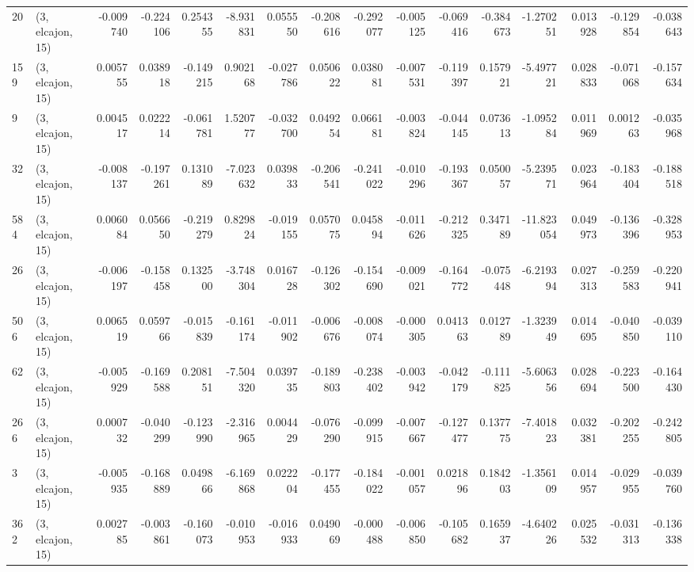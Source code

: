 \begin{tabular}{llrrrrrrrrrrrrrr}
20  &  (3, elcajon, 15) &  -0.009740 & -0.224106 &  0.254355 &   -8.931831 &  0.055550 &  -0.208616 & -0.292077 & -0.005125 & -0.069416 & -0.384673 &   -1.270251 &  0.013928 & -0.129854 & -0.038643 \\
159 &  (3, elcajon, 15) &   0.005755 &  0.038918 & -0.149215 &    0.902168 & -0.027786 &   0.050622 &  0.038081 & -0.007531 & -0.119397 &  0.157921 &   -5.497721 &  0.028833 & -0.071068 & -0.157634 \\
9   &  (3, elcajon, 15) &   0.004517 &  0.022214 & -0.061781 &    1.520777 & -0.032700 &   0.049254 &  0.066181 & -0.003824 & -0.044145 &  0.073613 &   -1.095284 &  0.011969 &  0.001263 & -0.035968 \\
32  &  (3, elcajon, 15) &  -0.008137 & -0.197261 &  0.131089 &   -7.023632 &  0.039833 &  -0.206541 & -0.241022 & -0.010296 & -0.193367 &  0.050057 &   -5.239571 &  0.023964 & -0.183404 & -0.188518 \\
584 &  (3, elcajon, 15) &   0.006084 &  0.056650 & -0.219279 &    0.829824 & -0.019155 &   0.057075 &  0.045894 & -0.011626 & -0.212325 &  0.347189 &  -11.823054 &  0.049973 & -0.136396 & -0.328953 \\
26  &  (3, elcajon, 15) &  -0.006197 & -0.158458 &  0.132500 &   -3.748304 &  0.016728 &  -0.126302 & -0.154690 & -0.009021 & -0.164772 & -0.075448 &   -6.219394 &  0.027313 & -0.259583 & -0.220941 \\
506 &  (3, elcajon, 15) &   0.006519 &  0.059766 & -0.015839 &   -0.161174 & -0.011902 &  -0.006676 & -0.008074 & -0.000305 &  0.041363 &  0.012789 &   -1.323949 &  0.014695 & -0.040850 & -0.039110 \\
62  &  (3, elcajon, 15) &  -0.005929 & -0.169588 &  0.208151 &   -7.504320 &  0.039735 &  -0.189803 & -0.238402 & -0.003942 & -0.042179 & -0.111825 &   -5.606356 &  0.028694 & -0.223500 & -0.164430 \\
266 &  (3, elcajon, 15) &   0.000732 & -0.040299 & -0.123990 &   -2.316965 &  0.004429 &  -0.076290 & -0.099915 & -0.007667 & -0.127477 &  0.137775 &   -7.401823 &  0.032381 & -0.202255 & -0.242805 \\
3   &  (3, elcajon, 15) &  -0.005935 & -0.168889 &  0.049866 &   -6.169868 &  0.022204 &  -0.177455 & -0.184022 & -0.001057 &  0.021896 &  0.184203 &   -1.356109 &  0.014957 & -0.029955 & -0.039760 \\
362 &  (3, elcajon, 15) &   0.002785 & -0.003861 & -0.160073 &   -0.010953 & -0.016933 &   0.049069 & -0.000488 & -0.006850 & -0.105682 &  0.165937 &   -4.640226 &  0.025532 & -0.031313 & -0.136338 \\

\end{tabular}

